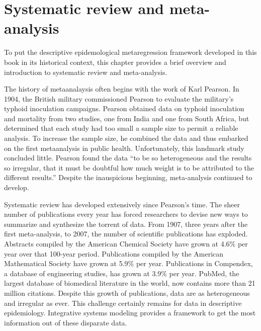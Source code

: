 \section{Systematic review and meta-analysis}
To put the descriptive epidemological
metaregression framework developed in this book in its historical context, this chapter provides a brief
overview and introduction to systematic review and meta-analysis.

The history of metaanalaysis often begins with the work of Karl
Pearson.  In 1904, the British military commissioned Pearson to
evaluate the military's typhoid inoculation
campaigns.\cite{Pearson_Report_1904} Pearson obtained data on typhoid
inoculation and mortality from two studies, one from India and one
from South Africa, but determined that each study had too small a
sample size to permit a reliable analysis. To increase the sample
size, he combined the data and thus embarked on the first
metaanalysis in public health. Unfortunately, this landmark study concluded little. Pearson found the
data ``to be so heterogeneous and the results so irregular, that it
must be doubtful how much weight is to be attributed to the different
results.'' Despite the inauspicious beginning, meta-analysis continued
to develop.


Systematic review has developed extensively since Pearson's time. The
sheer number of publications every year has forced researchers to
devise new ways to summarize and synthesize the torrent of data. From
1907, three years after the first meta-analysis, to 2007, the number of
scientific publications has exploded. Abstracts compiled by the
American Chemical Society have grown at 4.6\% per year over that
100-year period. Publications compiled by the American Mathematical
Society have grown at 5.9\% per year.  Publications in Compendex, a
database of engineering studies, has grown at 3.9\% per year.
\cite{Larsen_Rate_2010} PubMed, the largest database of biomedical
literature in the world, now contains more than 21 million citations.
\cite{US_PubMed_2012} Despite this growth of publications, data are 
as heterogeneous and irregular as ever. This challenge certainly remains 
for data in descriptive epidemiology. Integrative systems modeling 
provides a framework to get the most information out of these disparate data.

